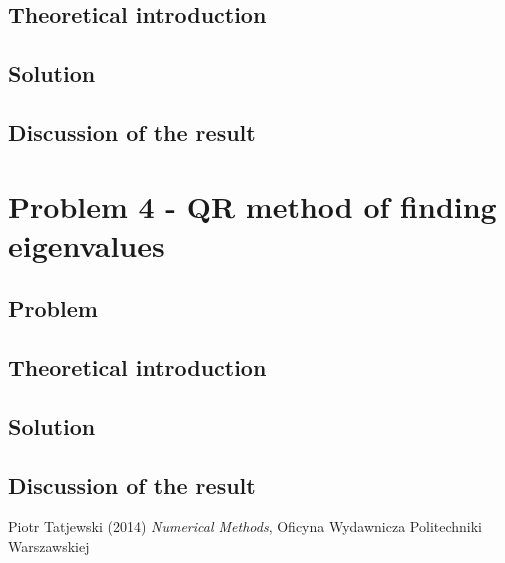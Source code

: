 \documentclass{report}
\begin{document}
\section{Theoretical introduction}

\section{Solution}

\section{Discussion of the result}
\chapter{Problem 4 - QR method of finding eigenvalues}

\section{Problem}

\section{Theoretical introduction}

\section{Solution}

\section{Discussion of the result}

\begin{thebibliography}{9}
Piotr Tatjewski (2014) \emph{Numerical Methods}, Oficyna Wydawnicza Politechniki Warszawskiej
\end{thebibliography}
\end{document}
